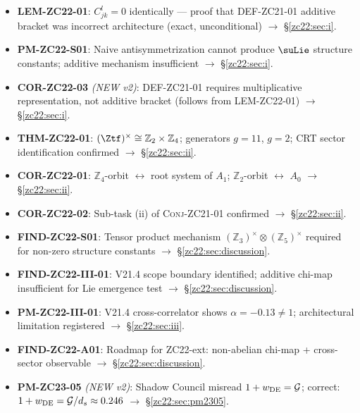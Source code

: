 \documentclass[12pt, a4paper]{article}
\begin{document}
\begin{formalbox}[title={Atomic Units Introduced by TASK-ZC22 v2 (11 units)}]
\begin{itemize}[leftmargin=*, noitemsep]
  \item \textbf{LEM-ZC22-01}: $C_{jk}^l = 0$ identically --- proof that
    DEF-ZC21-01 additive bracket was incorrect architecture (exact, unconditional)
    $\to$ \S\ref{zc22:sec:i}.
  \item \textbf{PM-ZC22-S01}: Naive antisymmetrization cannot produce
    $\suLie$ structure constants; additive mechanism insufficient
    $\to$ \S\ref{zc22:sec:i}.
  \item \textbf{COR-ZC22-03} \emph{(NEW v2)}: DEF-ZC21-01 requires multiplicative
    representation, not additive bracket (follows from LEM-ZC22-01)
    $\to$ \S\ref{zc22:sec:i}.
  \item \textbf{THM-ZC22-01}: $(\Ztf)^\times \cong \mathbb{Z}_2\times\mathbb{Z}_4$;
    generators $g=11$, $g=2$; CRT sector identification confirmed
    $\to$ \S\ref{zc22:sec:ii}.
  \item \textbf{COR-ZC22-01}: $\mathbb{Z}_4$-orbit $\leftrightarrow$
    root system of $A_1$; $\mathbb{Z}_2$-orbit $\leftrightarrow$ $A_0$
    $\to$ \S\ref{zc22:sec:ii}.
  \item \textbf{COR-ZC22-02}: Sub-task (ii) of \textsc{Conj-ZC21-01}
    confirmed
    $\to$ \S\ref{zc22:sec:ii}.
  \item \textbf{FIND-ZC22-S01}: Tensor product mechanism
    $(\mathbb{Z}_3)^\times \otimes (\mathbb{Z}_5)^\times$
    required for non-zero structure constants
    $\to$ \S\ref{zc22:sec:discussion}.
  \item \textbf{FIND-ZC22-III-01}: V21.4 scope boundary identified;
    additive chi-map insufficient for Lie emergence test
    $\to$ \S\ref{zc22:sec:discussion}.
  \item \textbf{PM-ZC22-III-01}: V21.4 cross-correlator shows
    $\alpha = -0.13 \neq 1$; architectural limitation registered
    $\to$ \S\ref{zc22:sec:iii}.
  \item \textbf{FIND-ZC22-A01}: Roadmap for ZC22-ext:
    non-abelian chi-map + cross-sector observable
    $\to$ \S\ref{zc22:sec:discussion}.
  \item \textbf{PM-ZC23-05} \emph{(NEW v2)}: Shadow Council misread
    $1+w_{\rm DE} = \mathcal{G}$; correct: $1+w_{\rm DE} = \mathcal{G}/d_s \approx 0.246$
    $\to$ \S\ref{zc22:sec:pm2305}.
\end{itemize}
\end{formalbox}
\end{document}
